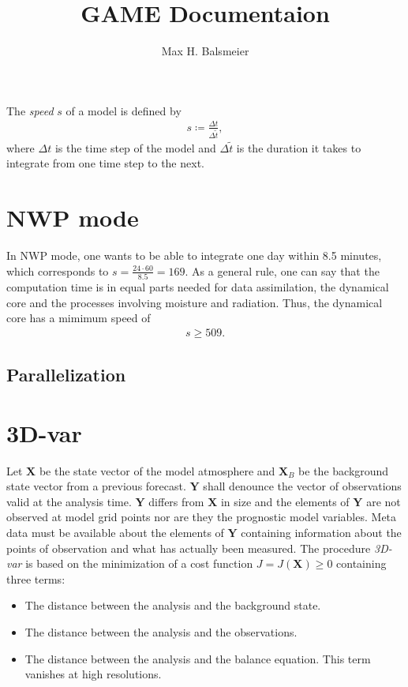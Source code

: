 \documentclass{article}
\title{GAME Documentaion}
\author{Max H. Balsmeier}
\date{}
\begin{document}
\maketitle

The \textit{speed} $s$ of a model is defined by
%
\begin{eqnarray}
s \coloneqq \frac{\Delta t}{\Delta\tilde{t}},
\end{eqnarray}
%
where $\Delta t$ is the time step of the model and $\Delta\tilde{t}$ is the duration it takes to integrate from one time step to the next.

\section{NWP mode}
\label{sec:nwp_mode}

In NWP mode, one wants to be able to integrate one day within 8.5 minutes, which corresponds to $s = \frac{24\cdot 60}{8.5} = 169$. As a general rule, one can say that the computation time is in equal parts needed for data assimilation, the dynamical core and the processes involving moisture and radiation. Thus, the dynamical core has a mimimum speed of
%
\begin{eqnarray}
s \geq 509.
\end{eqnarray}

\subsection{Parallelization}
\label{sec:parallelization}

\section{3D-var}
\label{sec:3d-var}

Let $\mathbf{X}$ be the state vector of the model atmosphere and $\mathbf{X}_B$ be the background state vector from a previous forecast. $\mathbf{Y}$ shall denounce the vector of observations valid at the analysis time. $\mathbf{Y}$ differs from $\mathbf{X}$ in size and the elements of $\mathbf{Y}$ are not observed at model grid points nor are they the prognostic model variables. Meta data must be available about the elements of $\mathbf{Y}$ containing information about the points of observation and what has actually been measured. The procedure \textit{3D-var} is based on the minimization of a cost function $J = J\left(\mathbf{X}\right) \geq 0$ containing three terms:
%
\begin{itemize}
\item The distance between the analysis and the background state.
\item The distance between the analysis and the observations.
\item The distance between the analysis and the balance equation. This term vanishes at high resolutions.
\end{itemize}
\end{document}
